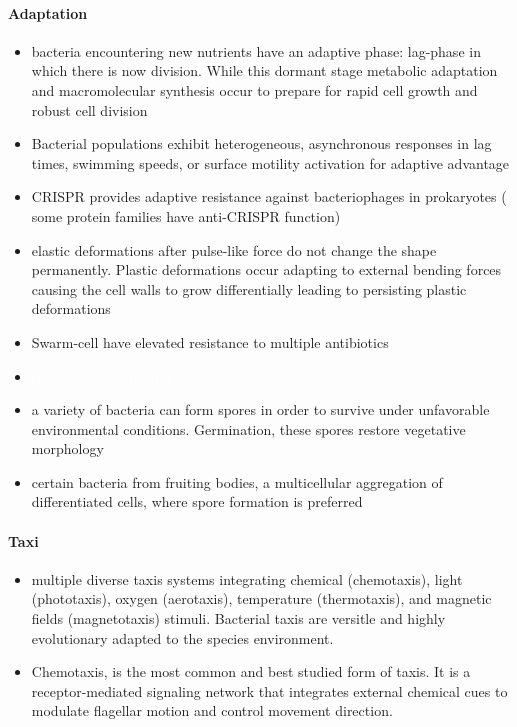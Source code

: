 \documentclass{article}
\newcommand{\todo}[1]{\colorbox{WildStrawberry}{\textcolor{white}{#1}}}
\begin{document}
\paragraph{Adaptation}
\begin{itemize}
    \item \cite{Bertrand2019} bacteria encountering new nutrients have an adaptive phase: lag-phase in which there is now division. While this dormant stage metabolic adaptation and macromolecular synthesis occur to prepare  for rapid cell growth and robust cell division
    \item \cite{Senkei2007} Bacterial populations exhibit heterogeneous, asynchronous responses in lag times, swimming speeds, or surface motility activation for adaptive advantage
    \item \cite{Barrangou2007} CRISPR provides adaptive resistance against bacteriophages \cite{Duckworth2002} in prokaryotes (\cite{Borges2017} some protein families have anti-CRISPR function)
    \item \cite{Amir2014_2} elastic deformations after pulse-like force do not change the shape permanently. Plastic deformations occur adapting to external bending forces causing the cell walls to grow differentially leading to persisting plastic deformations
    \item \cite{Kim2003, Lai2009} Swarm-cell have elevated resistance to multiple antibiotics
    \item \todo{sporilation and fruiting body}
    \item \cite{Huan2021, Errington2020, Licking2000, Barák2019} a variety of bacteria can form spores in order to survive under unfavorable environmental conditions. Germination, these spores restore vegetative morphology
    \item \cite{Licking2000, Jose2016, Branda2001} certain bacteria from fruiting bodies, a multicellular aggregation of differentiated cells, where spore formation is preferred
\end{itemize}

\paragraph{Taxi}
\begin{itemize}
    \item \cite{Krell2011} multiple diverse taxis systems integrating chemical (chemotaxis), light (phototaxis), oxygen (aerotaxis), temperature (thermotaxis), and magnetic fields (magnetotaxis) stimuli. Bacterial taxis are versitle and highly evolutionary adapted to the species environment.
    \item \cite{Nikita2009, Bourret2002} Chemotaxis, is the most common and best studied form of taxis. It is a receptor-mediated signaling network that integrates external chemical cues to modulate flagellar motion and control movement direction.
\end{itemize}
\end{document}
